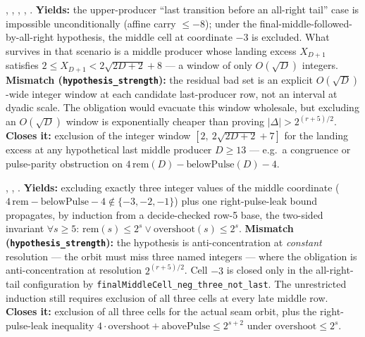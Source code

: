 \begin{obs} 
,
,
,
,
.
\textbf{Yields:} the upper-producer ``last transition before an all-right tail'' case is
impossible unconditionally (affine carry $\le -8$); under the final-middle-followed-by-all-right
hypothesis, the middle cell at coordinate $-3$ is excluded. What survives in that scenario is a middle producer whose landing excess $X_{D+1}$
satisfies $2 \le X_{D+1} < 2\sqrt{2D+2}+8$ — a window of only $O(\sqrt D)$ integers.
\textbf{Mismatch (\texttt{hypothesis\_strength}):} the residual bad set is an explicit
$O(\sqrt D)$-wide integer window at each candidate last-producer row, not an interval at dyadic
scale. The obligation would evacuate this window wholesale, but excluding an $O(\sqrt D)$ window
is exponentially cheaper than proving $|\Delta|>2^{(r+5)/2}$.
\textbf{Closes it:} exclusion of the integer window $[2,\ 2\sqrt{2D+2}+7]$ for the landing excess
at any hypothetical last middle producer $D \ge 13$ — e.g.\ a congruence or pulse-parity
obstruction on $4\,\mathrm{rem}(D)-\mathrm{belowPulse}(D)-4$.
\end{obs}

\begin{obs} 
,
,
.
\textbf{Yields:} excluding exactly three integer values of the middle coordinate
($4\,\mathrm{rem}-\mathrm{belowPulse}-4 \notin \{-3,-2,-1\}$) plus one right-pulse-leak bound
propagates, by induction from a decide-checked row-5 base, the two-sided invariant $\forall s
\ge 5$: $\mathrm{rem}(s) \le 2^s \vee \mathrm{overshoot}(s) \le 2^s$.
\textbf{Mismatch (\texttt{hypothesis\_strength}):} the hypothesis is anti-concentration at
\emph{constant} resolution — the orbit must miss three named integers — where the obligation is
anti-concentration at resolution $2^{(r+5)/2}$. Cell $-3$ is closed only in the all-right-tail configuration by
\texttt{finalMiddleCell\_neg\_three\_not\_last}. The unrestricted induction still requires
exclusion of all three cells at every late middle row.
\textbf{Closes it:} exclusion of all three cells for the actual seam orbit, plus the right-pulse-leak inequality $4\cdot\mathrm{overshoot}+\mathrm{abovePulse} \le
2^{s+2}$ under $\mathrm{overshoot} \le 2^s$.
\end{obs}

